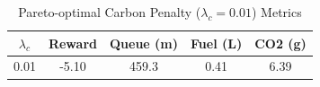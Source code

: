 \begin{table}[h]
\centering
\begin{tabular}{|c|c|c|c|c|}
\hline
$\lambda_c$ & Reward & Queue (m) & Fuel (L) & CO2 (g) \\
\hline
0.01 & -5.10 & 459.3 & 0.41 & 6.39 \\
\hline
\end{tabular}
\caption{Pareto-optimal Carbon Penalty ($\lambda_c = 0.01$) Metrics}
\end{table}